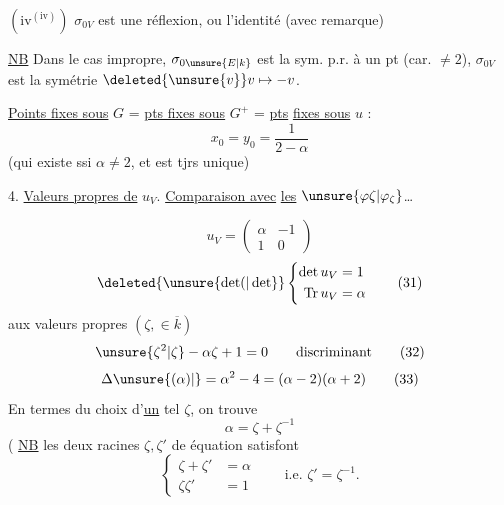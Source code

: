 $(\mathrm{iv}^{(\mathrm{iv})})$ $\sigma_{0V}$ est une réflexion, ou l'identité
(avec  remarque)

\uline{NB} Dans le cas impropre, $\sigma_{0\unsure{E|k}}$ est la sym. p.r. à
un pt (car. $\ne2$), $\sigma_{0V}$ est la symétrie $\deleted{\unsure{v}}v\mapsto-v$.

\uline{Points fixes sous} $G$ = \uline{pts fixes sous} $G^+$ = \uline{pts}
\uline{fixes sous} $u$ :
\[ x_0=y_0=\frac{1}{2-\alpha} \tag*{(29)} \]
(qui existe ssi $\alpha\ne2$, et est tjrs unique)

4. \uline{Valeurs propres de} $u_V$. \uline{Comparaison avec}
\uline{les} $\unsure{\varphi\zeta|\varphi_\zeta}$\ldots

\[ u_V=\begin{pmatrix}\alpha&-1\\1&0\end{pmatrix} \tag*{(30)} \]
\[ \deleted{\unsure{\det(|\det}} \left\{\begin{aligned}\det u_V&=1\\
\operatorname{Tr} u_V&=\alpha\end{aligned}\right. \tag*{(31)} \]
 aux valeurs propres $(\zeta,\in\overline{k})$
\[ \unsure{\zeta^2|\zeta}-\alpha\zeta+1=0\qquad\text{discriminant} \tag*{(32)} \]
\[ \Delta\unsure{(\alpha)|{}}=\alpha^2-4=(\alpha-2)(\alpha+2) \tag*{(33)} \]
En termes du choix d'\uline{un} tel $\zeta$, on
trouve
\[ \alpha=\zeta+\zeta^{-1} \tag*{(33)} \]
( \uline{NB} les deux racines $\zeta,\zeta'$ de  équation
satisfont
\[ \left\{\begin{aligned}\zeta+\zeta'&=\alpha\\
\zeta\zeta'&=1\end{aligned}\right.\qquad\text{i.e. }\zeta'=\zeta^{-1}. \tag*{(34)} \]
